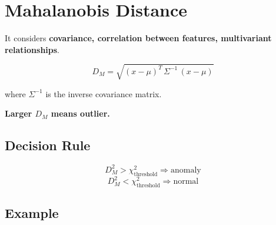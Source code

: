 \documentclass[12pt,a4paper]{article}
\begin{document}
\section{Mahalanobis Distance}

\begin{definitionbox}
It considers \textbf{covariance, correlation between features, multivariant relationships}.

\[
\boxed{D_M = \sqrt{(x-\mu)^T \,\Sigma^{-1}\, (x-\mu)}}
\]

where $\Sigma^{-1}$ is the inverse covariance matrix.

\textbf{Larger $D_M$ means outlier.}
\end{definitionbox}

\subsection{Decision Rule}
\[
D_M^2 > \chi^2_{\text{threshold}} \Rightarrow \text{anomaly}
\]
\[
D_M^2 < \chi^2_{\text{threshold}} \Rightarrow \text{normal}
\]

\subsection{Example}
\end{document}
